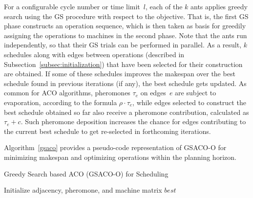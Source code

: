 For a configurable cycle number or time limit~$l$,
each of the $k$ ants applies greedy search
using the GS procedure with respect to the objective.
That is, the first GS phase constructs an operation sequence, which is
then taken as basis for greedily assigning the operations to machines
in the second phase.   
Note that the ants run independently, so that their GS trials
can be performed in parallel.
As a result, $k$ schedules along with edges between operations
(described in Subsection~\ref{subsec:initialization})
that have been selected for their construction are obtained.
If some of these schedules improves the makespan over the best
schedule found in previous iterations (if any),
the best schedule gets updated.
As common for ACO algorithms,
pheromones $\tau_e$ on edges~$e$ are subject to evaporation,
according to the formula $\rho\cdot\tau_e$,
while edges selected to construct the best schedule obtained
so far also receive a pheromone contribution,
calculated as $\tau_e+c$.
Such pheromone deposition increases the chance for edges contributing to the
current best schedule
to get re-selected %
in forthcoming iterations.

Algorithm~\ref{gsaco} provides a pseudo-code representation of
GSACO-O for minimizing makespan and optimizing operations within the planning horizon.

\begin{algorithm}[ht]
	\caption{Greedy Search based ACO (GSACO-O) for Scheduling}
	\label{gsaco}
	Initialize adjacency, pheromone, and machine matrix\; 
	\Return $\mathit{best}$\;
\end{algorithm}


